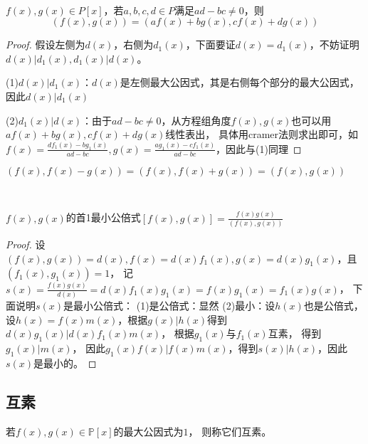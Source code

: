 ~

\begin{theorem}[保最大公因式]
  $f(x),g(x) \in P[x]$，若$a,b,c,d \in P$满足$ad - bc \neq 0$，则
  \begin{equation*}
    (f(x),g(x)) = (af(x) + bg(x), cf(x) + dg(x))
  \end{equation*}
\end{theorem}

\begin{proof}
  假设左侧为$d(x)$，右侧为$d_1(x)$，下面要证$d(x) = d_1(x)$，不妨证明$d(x)|d_1(x), d_1(x)|d(x)$。

  (1)$d(x)|d_1(x)$：$d(x)$是左侧最大公因式，其是右侧每个部分的最大公因式，因此$d(x)|d_1(x)$

  (2)$d_1(x)|d(x)$：由于$ad - bc \neq 0$，从方程组角度$f(x),g(x)$也可以用$af(x) + bg(x), cf(x) + dg(x)$线性表出，
  具体用cramer法则求出即可，如$f(x) = \frac{df_1(x) - bg_1(x)}{ad - bc}, g(x) = \frac{ag_1(x) - cf_1(x)}{ad - bc}$，因此与(1)同理
\end{proof}

\begin{corollary}[加减保最大公因式]
  $(f(x),f(x) - g(x)) = (f(x),f(x) + g(x)) = (f(x),g(x))$
\end{corollary}

~

\begin{theorem}[最小公倍式的表示]
  $f(x),g(x)$的首1最小公倍式$[f(x),g(x)] = \frac{f(x)g(x)}{(f(x),g(x))}$
\end{theorem}

\begin{proof}
  设$(f(x),g(x)) = d(x), f(x) = d(x) f_1(x), g(x) = d(x)g_1(x)$，且$(f_1(x),g_1(x)) = 1$，
  记$s(x) = \frac{f(x)g(x)}{d(x)} = d(x)f_1(x)g_1(x) = f(x)g_1(x) = f_1(x)g(x)$，
  下面说明$s(x)$是最小公倍式：
  (1)是公倍式：显然
  (2)最小：设$h(x)$也是公倍式，
  设$h(x) = f(x)m(x)$，根据$g(x)|h(x)$得到$d(x)g_1(x) |d(x)f_1(x)m(x)$，
  根据$g_1(x)$与$f_1(x)$互素，
  得到$g_1(x)|m(x)$，
  因此$g_1(x)f(x)|f(x)m(x)$，得到$s(x)|h(x)$，因此$s(x)$是最小的。
\end{proof}

\subsection{互素}

\begin{definition}[互素]
  若$f(x),g(x) \in \mathbb{P}[x]$的最大公因式为$1$，
  则称它们互素。
\end{definition}

